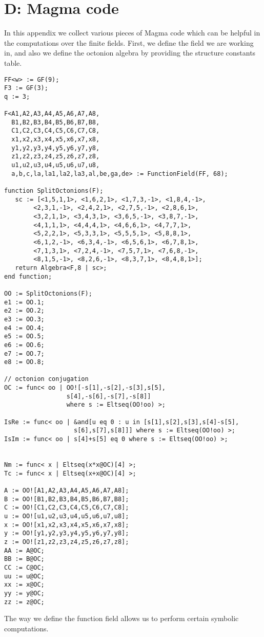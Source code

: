 \chapter{D: Magma code}
\label{AppD}

In this appendix we collect various pieces
of Magma code which can be helpful in the
computations over the finite fields. First, we define the field we are working 
in, and also we define the octonion algebra
by providing the structure constants table.
\begin{verbatim}
FF<w> := GF(9); 
F3 := GF(3); 
q := 3;

F<A1,A2,A3,A4,A5,A6,A7,A8,
  B1,B2,B3,B4,B5,B6,B7,B8,
  C1,C2,C3,C4,C5,C6,C7,C8,
  x1,x2,x3,x4,x5,x6,x7,x8,
  y1,y2,y3,y4,y5,y6,y7,y8,
  z1,z2,z3,z4,z5,z6,z7,z8,
  u1,u2,u3,u4,u5,u6,u7,u8,
  a,b,c,la,la1,la2,la3,al,be,ga,de> := FunctionField(FF, 68);

function SplitOctonions(F);
   sc := [<1,5,1,1>, <1,6,2,1>, <1,7,3,-1>, <1,8,4,-1>, 
   		<2,3,1,-1>, <2,4,2,1>, <2,7,5,-1>, <2,8,6,1>,
   		<3,2,1,1>, <3,4,3,1>, <3,6,5,-1>, <3,8,7,-1>, 
   		<4,1,1,1>, <4,4,4,1>, <4,6,6,1>, <4,7,7,1>,
   		<5,2,2,1>, <5,3,3,1>, <5,5,5,1>, <5,8,8,1>,
   		<6,1,2,-1>, <6,3,4,-1>, <6,5,6,1>, <6,7,8,1>,
   		<7,1,3,1>, <7,2,4,-1>, <7,5,7,1>, <7,6,8,-1>,
   		<8,1,5,-1>, <8,2,6,-1>, <8,3,7,1>, <8,4,8,1>];
   return Algebra<F,8 | sc>;
end function;

OO := SplitOctonions(F);
e1 := OO.1;
e2 := OO.2;
e3 := OO.3;
e4 := OO.4;
e5 := OO.5;
e6 := OO.6;
e7 := OO.7;
e8 := OO.8;

// octonion conjugation
OC := func< oo | OO![-s[1],-s[2],-s[3],s[5],
                 s[4],-s[6],-s[7],-s[8]] 
                 where s := Eltseq(OO!oo) >; 
                 
IsRe := func< oo | &and[u eq 0 : u in [s[1],s[2],s[3],s[4]-s[5],
                   s[6],s[7],s[8]]] where s := Eltseq(OO!oo) >;
IsIm := func< oo | s[4]+s[5] eq 0 where s := Eltseq(OO!oo) >;


Nm := func< x | Eltseq(x*x@OC)[4] >;
Tc := func< x | Eltseq(x+x@OC)[4] >;

A := OO![A1,A2,A3,A4,A5,A6,A7,A8];
B := OO![B1,B2,B3,B4,B5,B6,B7,B8];
C := OO![C1,C2,C3,C4,C5,C6,C7,C8];
u := OO![u1,u2,u3,u4,u5,u6,u7,u8];
x := OO![x1,x2,x3,x4,x5,x6,x7,x8];
y := OO![y1,y2,y3,y4,y5,y6,y7,y8];
z := OO![z1,z2,z3,z4,z5,z6,z7,z8];
AA := A@OC;
BB := B@OC;
CC := C@OC;
uu := u@OC;
xx := x@OC;
yy := y@OC;
zz := z@OC;
\end{verbatim}
The way we define the function field allows
us to perform certain symbolic computations.

